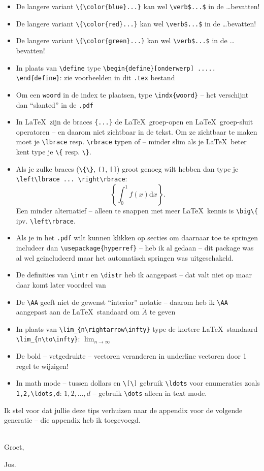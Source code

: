 \documentclass{2wa40summary}
\begin{document}
\begin{itemize}
			\item De langere variant \verb$\{\color{blue}...}$ kan wel \verb#\verb$...$# in de \dots bevatten!
			\item De langere variant \verb$\{\color{red}...}$ kan wel \verb#\verb$...$# in de \dots bevatten!
			\item De langere variant \verb$\{\color{green}...}$ kan wel \verb#\verb$...$# in de \dots bevatten!
			\item In plaats van \verb$\define$ type \verb$\begin{define}[onderwerp] ..... \end{define}$: zie voorbeelden in dit \verb$.tex$ bestand
			\item Om een \verb$woord$ in de index te plaatsen, type \verb$\indx{woord}$ -- het verschijnt dan ``slanted'' in de \verb$.pdf$
			\item In \LaTeX\ zijn de braces \verb${...}$ de \LaTeX\ groep-open en \LaTeX\ groep-sluit operatoren -- en daarom niet zichtbaar in de tekst. Om ze zichtbaar te maken moet je \verb$\lbrace$ resp.{} \verb$\rbrace$ typen of -- minder slim als je \LaTeX\ beter kent type je \verb$\{$ resp.{} \verb$\}$.
			\item Als je zulke braces (\verb$\{\}$, \verb$()$, \verb$[]$) groot genoeg wilt hebben dan type je \verb$\left\lbrace ... \right\rbrace$:
			\[
			\left\lbrace \int_0^1 f(x) \text{d}x \right\rbrace.
			\]
			Een minder alternatief -- alleen te snappen met meer \LaTeX\ kennis is \verb$\big\{$ ipv.{} \verb$\left\rbrace$.
			\item Als je in het \verb$.pdf$ wilt kunnen klikken op secties om daarnaar toe te springen includeer dan
			\verb$\usepackage{hyperref}$ -- heb ik al gedaan -- dit package was al wel geincludeerd maar het automatisch springen was uitgeschakeld.
			\item De definities van \verb$\intr$ en \verb$\distr$ heb ik aangepast -- dat valt niet op maar daar komt later voordeel van
			\item De \verb$\AA$ geeft niet de gewenst ``interior'' notatie -- daarom heb ik \verb$\AA$ aangepast aan de \LaTeX\ standaard
			om $\mathring{A}$ te geven
			\item In plaats van \verb$\lim_{n\rightarrow\infty}$ type de kortere \LaTeX\ standaard \verb$\lim_{n\to\infty}$: $\lim_{n\to\infty}$
			\item De bold -- vetgedrukte -- vectoren veranderen in underline vectoren door 1 regel te wijzigen!
			\item In math mode -- tussen dollars en \verb$\[\]$ gebruik \verb$\ldots$ voor enumeraties zoals \verb$1,2,\ldots,d$: $1,2,\ldots,d$ -- gebruik \verb$\dots$ alleen in text mode.
		\end{itemize}
		Ik stel voor dat jullie deze tips verhuizen naar de appendix voor de volgende generatie -- die appendix heb ik toegevoegd.
		
		\ \\
		Groet,
		
		Jos.
		
%		
		\newpage
			\printindex
		
\end{document}
